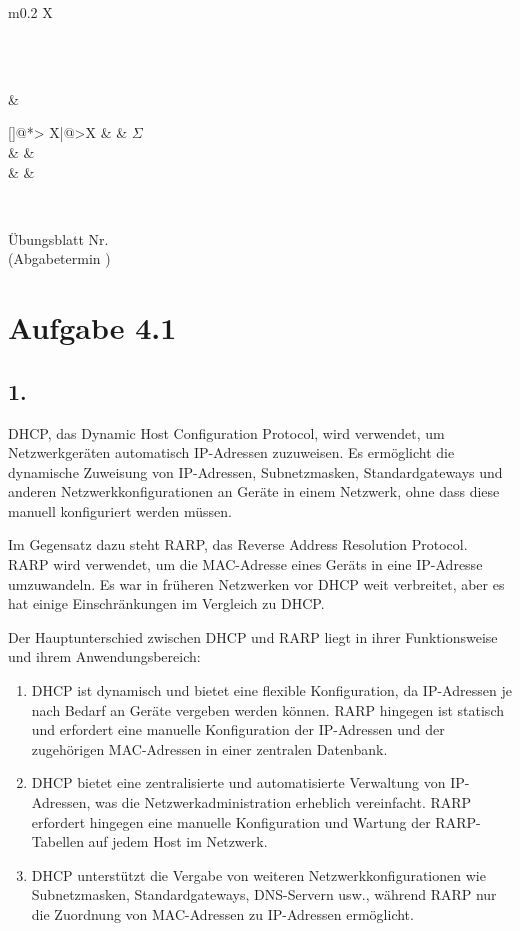 \documentclass[a4paper]{scrartcl}
\makeatletter
\def\header#1#2{
  \begin{center}
    {\Large Übungsblatt #1}\\
    {(Abgabetermin #2)}
  \end{center}
}
\newcounter{punktelistectr}
\newcounter{punkte}
\newcommand{\punkteliste}[2]{%
  \setcounter{punkte}{#2}%
  \addtocounter{punkte}{-#1}%
  \stepcounter{punkte}%
  \begin{center}%
  \begin{tabularx}{\linewidth}[]{@{}*{\thepunkte}{>{\centering\arraybackslash} X|}@{}>{\centering\arraybackslash}X}
      \forloop{punktelistectr}{#1}{\value{punktelistectr} < #2 } %
      {%
        \thepunktelistectr &
      }
      #2 &  $\Sigma$ \\
      \hline
      \forloop{punktelistectr}{#1}{\value{punktelistectr} < #2 } %
      {%
        &
      } &\\
      \forloop{punktelistectr}{#1}{\value{punktelistectr} < #2 } %
      {%
        &
      } &\\
    \end{tabularx}
  \end{center}
}
\makeatother
\begin{document}
\begin{tabularx}{\linewidth}{m{0.2 \linewidth}X}
  \begin{minipage}{\linewidth}
    \STUDENTA\\
    \STUDENTB\\
    \STUDENTC
  \end{minipage} & \begin{minipage}{\linewidth}
    \punkteliste{1}{\EXERCISES}
  \end{minipage}\\
\end{tabularx}

\header{Nr. \NUMBER}{\DEADLINE}




\section*{Aufgabe 4.1}
\subsection*{1.}

DHCP, das Dynamic Host Configuration Protocol, wird verwendet, um Netzwerkgeräten automatisch IP-Adressen zuzuweisen. Es ermöglicht die dynamische Zuweisung von IP-Adressen, Subnetzmasken, Standardgateways und anderen Netzwerkkonfigurationen an Geräte in einem Netzwerk, ohne dass diese manuell konfiguriert werden müssen.

Im Gegensatz dazu steht RARP, das Reverse Address Resolution Protocol. RARP wird verwendet, um die MAC-Adresse eines Geräts in eine IP-Adresse umzuwandeln. Es war in früheren Netzwerken vor DHCP weit verbreitet, aber es hat einige Einschränkungen im Vergleich zu DHCP.

Der Hauptunterschied zwischen DHCP und RARP liegt in ihrer Funktionsweise und ihrem Anwendungsbereich:

\begin{enumerate}
    \item DHCP ist dynamisch und bietet eine flexible Konfiguration, da IP-Adressen je nach Bedarf an Geräte vergeben werden können. RARP hingegen ist statisch und erfordert eine manuelle Konfiguration der IP-Adressen und der zugehörigen MAC-Adressen in einer zentralen Datenbank.
    
    \item DHCP bietet eine zentralisierte und automatisierte Verwaltung von IP-Adressen, was die Netzwerkadministration erheblich vereinfacht. RARP erfordert hingegen eine manuelle Konfiguration und Wartung der RARP-Tabellen auf jedem Host im Netzwerk.
    
    \item DHCP unterstützt die Vergabe von weiteren Netzwerkkonfigurationen wie Subnetzmasken, Standardgateways, DNS-Servern usw., während RARP nur die Zuordnung von MAC-Adressen zu IP-Adressen ermöglicht.
\end{enumerate}
\end{document}
